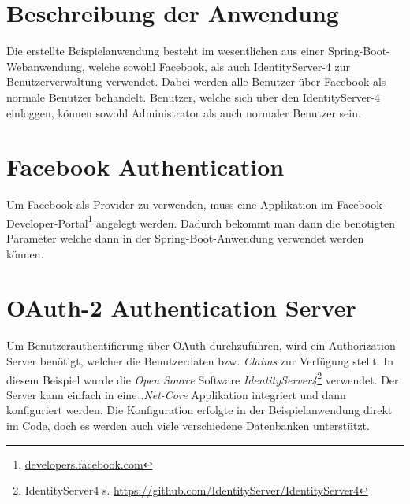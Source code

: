 \section{Beschreibung der Anwendung}
Die erstellte Beispielanwendung besteht im wesentlichen aus einer Spring-Boot-Webanwendung, welche sowohl Facebook, als auch IdentityServer-4 zur Benutzerverwaltung verwendet. Dabei werden alle Benutzer über Facebook als normale Benutzer behandelt. Benutzer, welche sich über den IdentityServer-4 einloggen, können sowohl Administrator als auch normaler Benutzer sein. 

\section{Facebook Authentication}
Um Facebook als Provider zu verwenden, muss eine Applikation im Facebook-Developer-Portal\footnote{\url{developers.facebook.com}} angelegt werden. Dadurch bekommt man dann die benötigten Parameter welche dann in der Spring-Boot-Anwendung verwendet werden können.

\section{OAuth-2 Authentication Server}
Um Benutzerauthentifierung über OAuth durchzuführen, wird ein Authorization Server benötigt, welcher die Benutzerdaten bzw. \emph{Claims} zur Verfügung stellt. In diesem Beispiel wurde die \emph{Open Source} Software \emph{IdentityServer4}\footnote{IdentityServer4 s. \url{https://github.com/IdentityServer/IdentityServer4}} verwendet. 
\newline
\newline
Der Server kann einfach in eine \emph{.Net-Core} Applikation integriert und dann konfiguriert werden. Die Konfiguration erfolgte in der Beispielanwendung direkt im Code, doch es werden auch viele verschiedene Datenbanken unterstützt.

